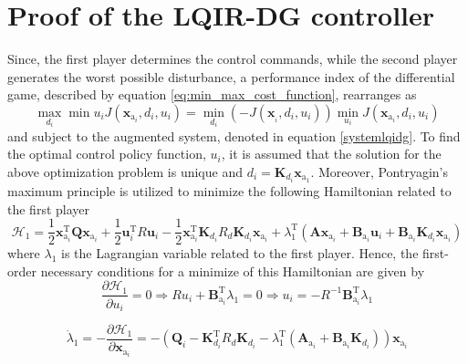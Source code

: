 \documentclass[3p]{elsarticle}
\begin{document}
\section{Proof of the LQIR-DG controller}
Since, the first player determines the control commands, while the second player generates the worst possible disturbance, a performance index of the differential game, described by equation \eqref{eq:min_max_cost_function}, rearranges as
\begin{equation}
    \max_{d_i}\min{u_i} J(\mathbf{x}_{\mathrm{a}_i}, d_i, u_i) = \min_{d_i}\left(-J(\mathbf{x}_{_i}, d_i, u_i)\right)\min_{u_i}J(\mathbf{x}_{\mathrm{a}_i}, d_i, u_i)
\end{equation}
and subject to the augmented system, denoted in equation \eqref{systemlqidg}. To find the optimal control policy function, $u_i$, it is assumed that the solution for the above optimization problem is unique and $d_i = \mathbf{K}_{d_i}\mathbf{x}_{\mathrm{a}_1}$.
Moreover, Pontryagin's maximum principle \cite{kirk2004optimal} is utilized to minimize the following Hamiltonian related to the first player
\begin{equation}
    \mathcal{H}_1 = \dfrac{1}{2}\mathbf{x}_{\mathrm{a}_i}^\mathrm{T} \mathbf{Q} \mathbf{x}_{\mathrm{a}_i} + \dfrac{1}{2}\mathbf{u}_i^\mathrm{T} R \mathbf{u}_i - \dfrac{1}{2}\mathbf{x}_{\mathrm{a}_i}^\mathrm{T} \mathbf{K}_{d_i} R_{d} \mathbf{K}_{d_i}  \mathbf{x}_{\mathrm{a}_i} + \lambda_1^\mathrm{T}(\mathbf{A}\mathbf{x}_{\mathrm{a}_i} + \mathbf{B}_{\mathrm{a}_i}\mathbf{u}_i + \mathbf{B}_{\mathrm{a}_i}\mathbf{K}_{d_i}\mathbf{x}_{\mathrm{a}_i}) \end{equation}
    where $\lambda_1$ is the Lagrangian variable related to the first player. Hence, the first-order necessary conditions for a minimize of this Hamiltonian are given by
    \begin{equation}\label{eq:Hamiltonian_u}
        \dfrac{\partial \mathcal{H}_1}{\partial u_i} = 0 \Rightarrow Ru_i + \mathbf{B}_{\mathrm{a}_i}^\mathrm{T}\lambda_1 = 0 \Rightarrow u_i = -R^{-1}\mathbf{B}_{\mathrm{a}_i}^\mathrm{T}\lambda_1
    \end{equation}

\begin{equation}\label{eq:Hamiltonian_lambda}
    \dot{\lambda}_1 = -\dfrac{\partial \mathcal{H}_1}{\partial \mathbf{x}_{\mathrm{a}_i}} = -( \mathbf{Q}_i - 
    \mathbf{K}_{d_i}^\mathrm{T} R_{d} \mathbf{K}_{d_i} -\lambda_1^\mathrm{T}(\mathbf{A}_{\mathrm{a}_i} + \mathbf{B}_{\mathrm{a}_i}\mathbf{K}_{d_i})) \mathbf{x}_{\mathrm{a}_i} 
\end{equation}
\end{document}
